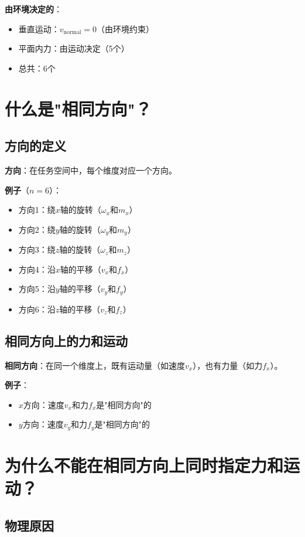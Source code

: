 \documentclass[12pt,a4paper]{article}
\begin{document}
\textbf{由环境决定的}：
\begin{itemize}
\item 垂直运动：$v_{\text{normal}} = 0$（由环境约束）
\item 平面内力：由运动决定（5个）
\item 总共：$6$个
\end{itemize}

\section{什么是"相同方向"？}

\subsection{方向的定义}

\textbf{方向}：在任务空间中，每个维度对应一个方向。

\textbf{例子}（$n = 6$）：
\begin{itemize}
\item 方向1：绕$x$轴的旋转（$\omega_x$和$m_x$）
\item 方向2：绕$y$轴的旋转（$\omega_y$和$m_y$）
\item 方向3：绕$z$轴的旋转（$\omega_z$和$m_z$）
\item 方向4：沿$x$轴的平移（$v_x$和$f_x$）
\item 方向5：沿$y$轴的平移（$v_y$和$f_y$）
\item 方向6：沿$z$轴的平移（$v_z$和$f_z$）
\end{itemize}

\subsection{相同方向上的力和运动}

\textbf{相同方向}：在同一个维度上，既有运动量（如速度$v_x$），也有力量（如力$f_x$）。

\textbf{例子}：
\begin{itemize}
\item $x$方向：速度$v_x$和力$f_x$是"相同方向"的
\item $y$方向：速度$v_y$和力$f_y$是"相同方向"的
\end{itemize}

\section{为什么不能在相同方向上同时指定力和运动？}

\subsection{物理原因}
\end{document}
